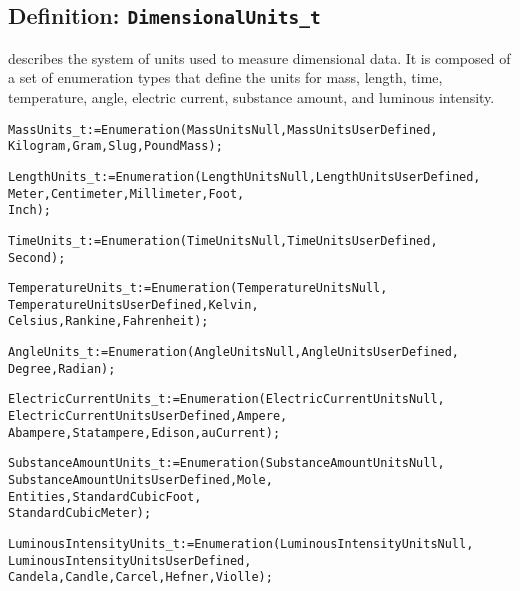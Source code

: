\subsection{Definition: \texttt{DimensionalUnits\_t}}
\label{s:DimensionalUnits}

 describes the system of units used to measure
dimensional data.
It is composed of a set of enumeration types that define the units for
mass, length, time, temperature, angle, electric current, substance
amount, and luminous intensity.

\begin{alltt}
  MassUnits\_t              := Enumeration( MassUnitsNull, MassUnitsUserDefined, 
                                           Kilogram, Gram, Slug, PoundMass ) ;

  LengthUnits\_t            := Enumeration( LengthUnitsNull, LengthUnitsUserDefined, 
                                           Meter, Centimeter, Millimeter, Foot, 
                                           Inch ) ;

  TimeUnits\_t              := Enumeration( TimeUnitsNull, TimeUnitsUserDefined, 
                                           Second ) ;

  TemperatureUnits\_t       := Enumeration( TemperatureUnitsNull, 
                                           TemperatureUnitsUserDefined, Kelvin, 
                                           Celsius, Rankine, Fahrenheit ) ;

  AngleUnits\_t             := Enumeration( AngleUnitsNull, AngleUnitsUserDefined, 
                                           Degree, Radian ) ;

  ElectricCurrentUnits\_t   := Enumeration( ElectricCurrentUnitsNull, 
                                           ElectricCurrentUnitsUserDefined, Ampere, 
                                           Abampere, Statampere, Edison, auCurrent ) ;

  SubstanceAmountUnits\_t   := Enumeration( SubstanceAmountUnitsNull, 
                                           SubstanceAmountUnitsUserDefined, Mole, 
                                           Entities, StandardCubicFoot,
                                           StandardCubicMeter ) ;

  LuminousIntensityUnits\_t := Enumeration( LuminousIntensityUnitsNull, 
                                           LuminousIntensityUnitsUserDefined, 
                                           Candela, Candle, Carcel, Hefner, Violle ) ;
\end{alltt}

